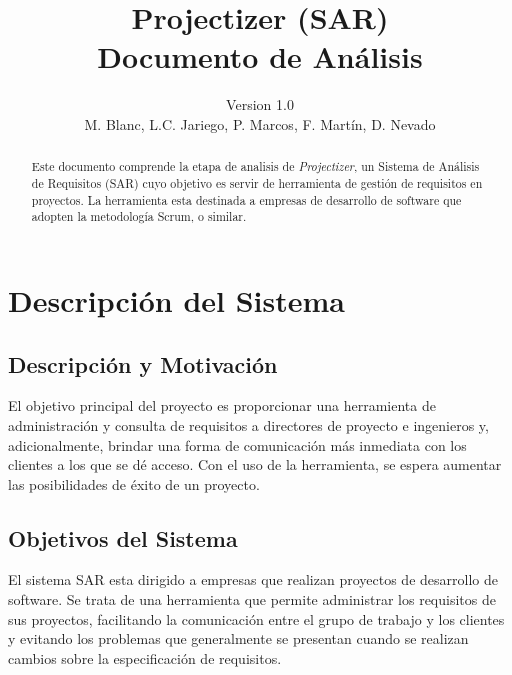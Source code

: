 \documentclass[a4paper, spanish]{article}
\title{Projectizer (SAR)\\ Documento de Análisis}
\author{Version 1.0 \\ M. Blanc, L.C. Jariego, P. Marcos, F. Martín, D. Nevado}
\begin{document}
\maketitle
\begin{abstract}
Este documento comprende la etapa de analisis de \textit{Projectizer}, un Sistema de Análisis de Requisitos (SAR) cuyo objetivo es servir de herramienta de gestión de requisitos en proyectos. La herramienta esta destinada a empresas de desarrollo de software que adopten la metodología Scrum, o similar.

\end{abstract}
\vspace{\fill}
\tableofcontents
\let\oldsection\section\renewcommand\section{\clearpage\oldsection}

\section{Descripción del Sistema}
\subsection{Descripción y Motivación}
El objetivo principal del proyecto es proporcionar una herramienta de administración y consulta de requisitos a directores de proyecto e ingenieros y, adicionalmente, brindar una forma de comunicación más inmediata con los clientes a los que se dé acceso.
Con el uso de la herramienta, se espera aumentar las posibilidades de éxito de un proyecto.


\subsection{Objetivos del Sistema}
El sistema SAR esta dirigido a empresas que realizan proyectos de desarrollo de
software. Se trata de una herramienta que permite administrar los requisitos
de sus proyectos, facilitando la comunicación entre el grupo de trabajo y los
clientes y evitando los problemas que generalmente se presentan cuando se realizan
cambios sobre la especificación de requisitos.
\end{document}
